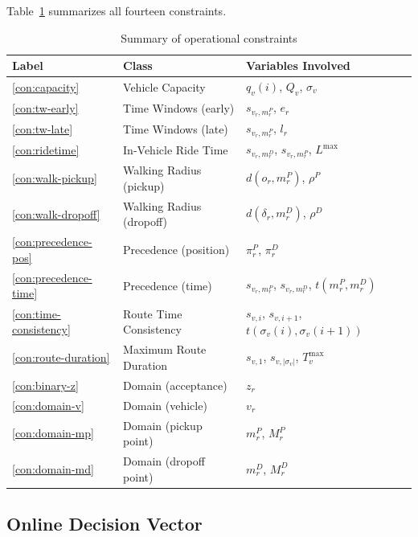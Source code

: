 Table~\ref{tab:constraints} summarizes all fourteen constraints.

\begin{table}[h]
\centering
\caption{Summary of operational constraints}
\label{tab:constraints}
\begin{tabular}{lll}
\toprule
\textbf{Label} & \textbf{Class} & \textbf{Variables Involved} \\
\midrule
\ref{con:capacity}         & Vehicle Capacity            & $q_v(i)$, $Q_v$, $\sigma_v$ \\
\ref{con:tw-early}         & Time Windows (early)        & $s_{v_r, m_r^P}$, $e_r$ \\
\ref{con:tw-late}          & Time Windows (late)         & $s_{v_r, m_r^P}$, $l_r$ \\
\ref{con:ridetime}         & In-Vehicle Ride Time        & $s_{v_r, m_r^D}$, $s_{v_r, m_r^P}$, $L^{\max}$ \\
\ref{con:walk-pickup}      & Walking Radius (pickup)     & $d(o_r, m_r^P)$, $\rho^P$ \\
\ref{con:walk-dropoff}     & Walking Radius (dropoff)    & $d(\delta_r, m_r^D)$, $\rho^D$ \\
\ref{con:precedence-pos}   & Precedence (position)       & $\pi_r^P$, $\pi_r^D$ \\
\ref{con:precedence-time}  & Precedence (time)           & $s_{v_r, m_r^P}$, $s_{v_r, m_r^D}$, $t(m_r^P, m_r^D)$ \\
\ref{con:time-consistency} & Route Time Consistency      & $s_{v,i}$, $s_{v,i+1}$, $t(\sigma_v(i), \sigma_v(i+1))$ \\
\ref{con:route-duration}   & Maximum Route Duration      & $s_{v,1}$, $s_{v,|\sigma_v|}$, $T_v^{\max}$ \\
\ref{con:binary-z}         & Domain (acceptance)         & $z_r$ \\
\ref{con:domain-v}         & Domain (vehicle)            & $v_r$ \\
\ref{con:domain-mp}        & Domain (pickup point)       & $m_r^P$, $M_r^P$ \\
\ref{con:domain-md}        & Domain (dropoff point)      & $m_r^D$, $M_r^D$ \\
\bottomrule
\end{tabular}
\end{table}

\subsection{Online Decision Vector}

